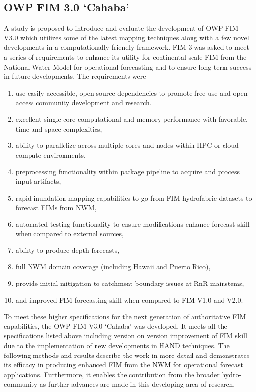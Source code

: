 \subsection{OWP FIM 3.0 `Cahaba'}
%
A study is proposed to introduce and evaluate the development of OWP FIM V3.0 which utilizes some of the latest mapping techniques along with a few novel developments in a computationally friendly framework. 
FIM 3 was asked to meet a series of requirements to enhance its utility for continental scale FIM from the National Water Model for operational forecasting and to ensure long-term success in future developments. 
The requirements were
%
\begin{enumerate}
\item use easily accessible, open-source dependencies to promote free-use and open-access community development and research.
\item excellent single-core computational and memory performance with favorable, time and space complexities,
\item ability to parallelize across multiple cores and nodes within HPC or cloud compute environments,
\item preprocessing functionality within package pipeline to acquire and process input artifacts,
\item rapid inundation mapping capabilities to go from FIM hydrofabric datasets to forecast FIMs from NWM,
\item automated testing functionality to ensure modifications enhance forecast skill when compared to external sources,
\item ability to produce depth forecasts,
\item full NWM domain coverage (including Hawaii and Puerto Rico),
\item provide initial mitigation to catchment boundary issues at RnR mainstems,
\item and improved FIM forecasting skill when compared to FIM V1.0 and V2.0.
\end{enumerate} 
%
To meet these higher specifications for the next generation of authoritative FIM capabilities, the OWP FIM V3.0 `Cahaba' was developed. 
It meets all the specifications listed above including version on version improvement of FIM skill due to the implementation of new developments in HAND techniques. 
The following methods and results describe the work in more detail and demonstrates its efficacy in producing enhanced FIM from the NWM for operational forecast applications. 
Furthermore, it enables the contribution from the broader hydro-community as further advances are made in this developing area of research.
%
